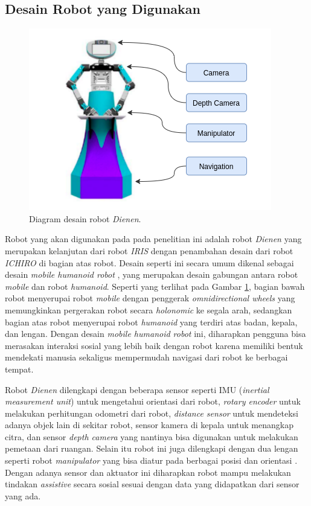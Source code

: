 \subsection{Desain Robot yang Digunakan}
\label{subsec:desainrobot}

\begin{figure} [ht]
  \centering
  \includegraphics[scale=0.55]{images/robot-design.png}
  \caption{Diagram desain robot \emph{Dienen}.}
  \label{fig:desainrobot}
\end{figure}

Robot yang akan digunakan pada pada penelitian ini adalah robot \emph{Dienen} yang merupakan kelanjutan dari robot \emph{IRIS} \citep{dikairono2020}\citep{zanuar2019} dengan penambahan desain dari robot \emph{ICHIRO} \citep{muhtadin2019} di bagian atas robot.
Desain seperti ini secara umum dikenal sebagai desain \emph{mobile humanoid robot} \citep{mohamed2012}, yang merupakan desain gabungan antara robot \emph{mobile} dan robot \emph{humanoid}.
Seperti yang terlihat pada Gambar \ref{fig:desainrobot}, bagian bawah robot menyerupai robot \emph{mobile} dengan penggerak \emph{omnidirectional wheels} yang memungkinkan pergerakan robot secara \emph{holonomic} ke segala arah\citep{oliveira2008}, sedangkan bagian atas robot menyerupai robot \emph{humanoid} yang terdiri atas badan, kepala, dan lengan.
Dengan desain \emph{mobile humanoid robot} ini, diharapkan pengguna bisa merasakan interaksi sosial yang lebih baik dengan robot karena memiliki bentuk mendekati manusia \citep{rossi2018} sekaligus mempermudah navigasi dari robot ke berbagai tempat.

Robot \emph{Dienen} dilengkapi dengan beberapa sensor seperti IMU (\emph{inertial measurement unit}) untuk mengetahui orientasi dari robot, \emph{rotary encoder} untuk melakukan perhitungan odometri dari robot, \emph{distance sensor} untuk mendeteksi adanya objek lain di sekitar robot, sensor kamera di kepala untuk menangkap citra, dan sensor \emph{depth camera} yang nantinya bisa digunakan untuk melakukan pemetaan dari ruangan.
Selain itu robot ini juga dilengkapi dengan dua lengan seperti robot \emph{manipulator} yang bisa diatur pada berbagai posisi dan orientasi \citep{iqbal2012}.
Dengan adanya sensor dan aktuator ini diharapkan robot mampu melakukan tindakan \emph{assistive} secara sosial sesuai dengan data yang didapatkan dari sensor yang ada.
